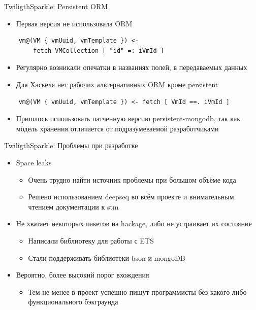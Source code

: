 \documentclass[10pt]{beamer}
\begin{document}
\begin{frame}[fragile]{TwiligthSparkle: Persistent ORM}
  \begin{itemize}
    \item Первая версия не использовала ORM
  \end{itemize}
  \begin{verbatim}
    vm@(VM { vmUuid, vmTemplate }) <-
        fetch VMCollection [ "id" =: iVmId ]
  \end{verbatim}
  \begin{itemize}
    \item Регулярно возникали опечатки в названиях полей, в передаваемых данных
    \item Для Хаскеля нет рабочих альтернативных ORM кроме persistent
  \end{itemize}
  \begin{verbatim}
    vm@(VM { vmUuid, vmTemplate }) <- fetch [ VmId ==. iVmId ]
  \end{verbatim}
  \begin{itemize}
    \item Пришлось использовать патченную версию persistent-mongodb, так как
    модель хранения отличается от подразумеваемой разработчиками
  \end{itemize}
\end{frame}

\begin{frame}{TwiligthSparkle: Проблемы при разработке}
  \begin{itemize}
    \item Space leaks
    \begin{itemize}
      \item Очень трудно найти источник проблемы при большом объёме кода
      \item Решено использованием deepseq во всём проекте и внимательным
      чтением документации к stm
    \end{itemize}
    \item Не хватает некоторых пакетов на hackage, либо не устраивает их состояние
    \begin{itemize}
      \item Написали библиотеку для работы с ETS
      \item Стали поддерживать библиотеки bson и mongoDB
    \end{itemize}
    \item Вероятно, более высокий порог вхождения
    \begin{itemize}
      \item Тем не менее в проект успешно пишут программисты без какого-либо
      функционального бэкграунда
    \end{itemize}
  \end{itemize}
\end{frame}
\end{document}
